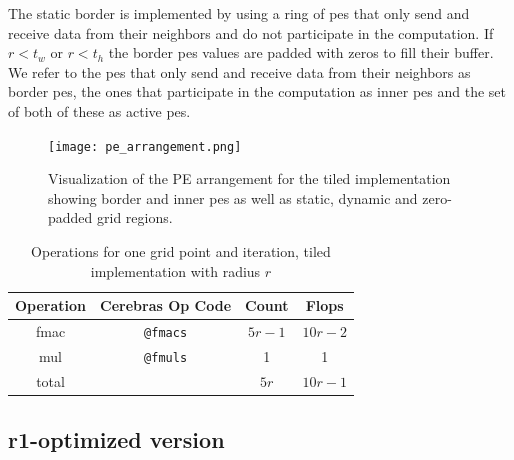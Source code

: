 The static border is implemented by using a ring of \acp{pe} that only send and receive data from their neighbors and do not participate in the computation. If $r<t_w$ or $r<t_h$ the border \acp{pe} values are padded with zeros to fill their buffer. We refer to the \acp{pe} that only send and receive data from their neighbors as border \acp{pe}, the ones that participate in the computation as inner \acp{pe} and the set of both of these as active \acp{pe}.

\begin{figure}
    \centering
    \texttt{[image: pe\_arrangement.png]}
    \caption{Visualization of the PE arrangement for the tiled implementation showing border and inner \acp{pe} as well as static, dynamic and zero-padded grid regions.}
    \label{fig:pe_arrangement}
\end{figure}

\begin{table}[h]
    \centering
    \caption{Operations for one grid point and iteration, tiled implementation with radius $r$}
    \label{tab:tiled_operations}
    \begin{tabular}{@{}cccc@{}}
        \toprule
        Operation & Cerebras Op Code & Count & Flops \\
        \midrule
        fmac & \texttt{@fmacs} & $5r-1$ & $10r-2$ \\
        mul & \texttt{@fmuls} & \num{1} & \num{1} \\
        \midrule
        total & & $5r$ & $10r-1$ \\
        \bottomrule
    \end{tabular}
\end{table}

\subsection{r1-optimized version}

